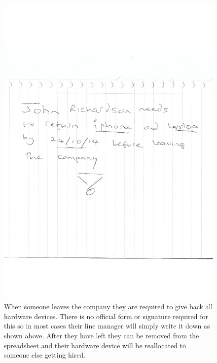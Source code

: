 \begin{figure}[H]
\includegraphics[width=.9\textwidth,height=.9\textheight,keepaspectratio]{LeaveOfWork.jpg}
\caption{When someone leaves the company they are required to give back all hardware devices. There is no official form or signature required for this so in most cases their line manager will simply write it down as shown above. After they have left they can be removed from the spreadsheet and their hardware device will be reallocated to someone else getting hired.} \label{LeaveOfWork}
\end{figure}

